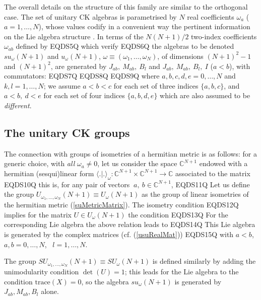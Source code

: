 \documentclass[12pt]{article}
\begin{document}
The overall details on the structure of this family are similar
to the orthogonal case. The set of unitary CK algebras is parametrised by
$N$ real coefficients ${\omega}_a$ ($a=1,\dots,N$), whose values codify in a
convenient way the pertinent information on the Lie algebra structure
\cite{Her:95,Her.San:96}. In terms of the $N(N+1)/2$
two-index coefficients
${\omega}_{ab}$ defined by
EQDS5Q
which verify
EQDS6Q
the algebras to be denoted $su_{\omega}(N+1)$ and $u_{\omega}(N+1)$,
${\omega} \equiv ({\omega}_1,\dots,{\omega}_N)$, of
dimensions $(N+1)^2-1$ and $(N+1)^2$, are generated by ${J}_{ab},\
{M}_{ab},\ {B}_l$ and ${J}_{ab},\ {M}_{ab},\ {B}_l,\ {I}$ ($a<b$), with commutators:
EQDS7Q
EQDS8Q
EQDS9Q
where $a, b, c, d, e=0, \dots, N$ and $k, l=1, \dots, N$; we assume
$a<b<c$ for each set of three  indices  $\{a,b,c\}$, and $a<b,\ d<e$
for each set of four indices $\{a,b,d,e\}$ which are also assumed to
be \emph{different}.

\subsection{The unitary CK groups}

The connection with groups of isometries of a hermitian metric is as
follows: for a generic choice, with \emph{all} ${\omega}_a \neq 0$, let us
consider the space ${{\mathbb C}}^{N+1}$ endowed with a hermitian
(sesqui)linear form $\langle .|. \rangle_{\omega} : {{\mathbb C}}^{N+1}\times
{{\mathbb C}}^{N+1}\to  {{\mathbb C}}$ associated to the matrix
EQDS10Q
this is, for any pair of vectors $\>a,\>b\in {{\mathbb C}}^{N+1}$,
EQDS11Q
Let us define the group $U_{{\omega}_1,\dots,{\omega}_N}(N+1)\equiv
U_{\omega}(N+1)$ as the group of linear isometries of
the hermitian metric (\ref{suMetricMatrix}). The isometry
condition
EQDS12Q
implies for the matrix
$U \in U_{\omega}(N+1)$ the condition
EQDS13Q
For the corresponding Lie algebra the above relation leads to
EQDS14Q
This Lie algebra is generated by
the complex matrices (cf. (\ref{usuRealMat}))
EQDS15Q
with $a<b$, $a,b=0,\dots,N$, \ $l=1,\dots,N$.

The group $SU_{{\omega}_1,\dots,{\omega}_N}(N+1)\equiv SU_{\omega}(N+1)$ is
defined similarly by adding the unimodularity condition $\det(U)=1$;
this leads for the Lie algebra to the condition ${\mbox{trace}}(X)
=0$, so the algebra $su_{\omega}(N+1)$ is generated by
${J}_{ab}, {M}_{ab}, {B}_l$ alone.
\end{document}
